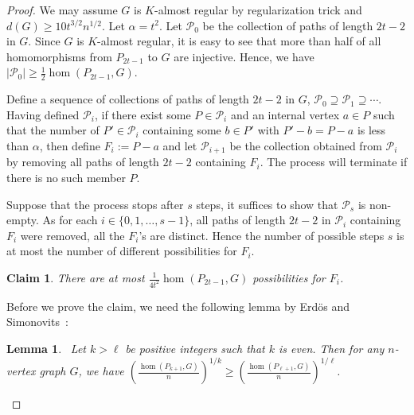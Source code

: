 \documentclass{article}
\newtheorem{lemma}[theorem]{Lemma}
\newtheorem{claim}[theorem]{Claim}
\theoremstyle{definition}
\begin{document}
\begin{proof}
    We may assume $G$ is $K$-almost regular by regularization trick and $d(G)\geq 10t^{3/2}n^{1/2}$. Let $\alpha=t^2$. Let $\mathcal{P}_0$ be the collection of paths of length $2t-2$ in $G$. Since $G$ is $K$-almost regular, it is easy to see that more than half of all homomorphisms from $P_{2t-1}$ to $G$ are injective. Hence, we have $|\mathcal{P}_0|\geq \frac{1}{2}\hom(P_{2t-1},G)$.
    
    Define a sequence of collections of paths of length $2t-2$ in $G$, $\mathcal{P}_0 \supseteq \mathcal{P}_1 \supseteq \cdots$. Having defined $\mathcal{P}_i$, if there exist some $P\in \mathcal{P}_i$ and an internal vertex $a\in P$ such that the number of $P'\in \mathcal{P}_i$ containing some $b\in P'$ with $P'-b = P-a$ is less than $\alpha$, then define $F_{i}:=P-a$ and let $\mathcal{P}_{i+1}$ be the collection obtained from $\mathcal{P}_i$ by removing all paths of length $2t-2$ containing $F_{i}$. The process will terminate if there is no such member $P$.

    Suppose that the process stops after $s$ steps, it suffices to show that $\mathcal{P}_{s}$ is non-empty. As for each $i\in \{0,1,\ldots,s-1\}$, all paths of length $2t-2$ in $\mathcal{P}_{i}$ containing $F_{i}$ were removed, all the $F_{i}$'s are distinct. Hence the number of possible steps $s$ is at most the number of different possibilities for $F_i$.

    \begin{claim}
        There are at most $\frac{1}{4t^2}\hom(P_{2t-1},G)$ possibilities for $F_i$.
    \end{claim}

    Before we prove the claim, we need the following lemma by Erd\"os and Simonovits~\cite{erdHos1982compactness}:

    \begin{lemma}~\cite{erdHos1982compactness}\label{erdHos1982compactness}
        Let $k>\ell$ be positive integers such that $k$ is even. Then for any $n$-vertex graph $G$, we have
        $(\frac{\hom(P_{k+1},G)}{n})^{1/k}\geq (\frac{\hom(P_{\ell+1},G)}{n})^{1/\ell}$.
    \end{lemma}



\end{proof}
\end{document}
